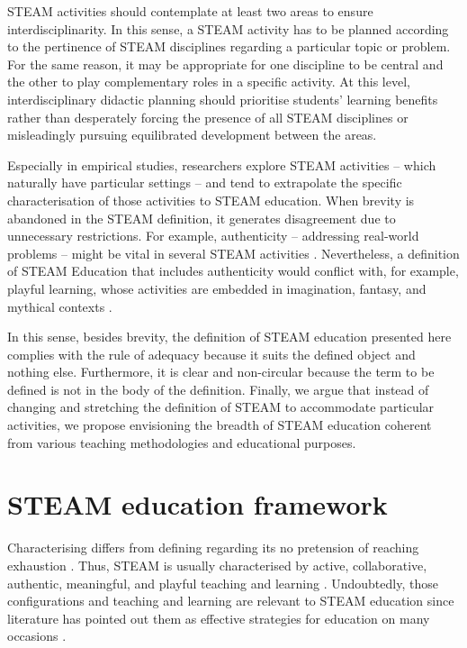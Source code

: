 \documentclass[english]{textolivre}
\begin{document}
STEAM activities should contemplate at least two areas to ensure interdisciplinarity. In this sense, a STEAM activity has to be planned according to the pertinence of STEAM disciplines regarding a particular topic or problem. For the same reason, it may be appropriate for one discipline to be central and the other to play complementary roles in a specific activity. At this level, interdisciplinary didactic planning should prioritise students’ learning benefits rather than desperately forcing the presence of all STEAM disciplines \cite{pearson_national_2017, thibaut_integrated_2018} or misleadingly pursuing equilibrated development between the areas.

Especially in empirical studies, researchers explore STEAM activities – which naturally have particular settings – and tend to extrapolate the specific characterisation of those activities to STEAM education. When brevity is abandoned in the STEAM definition, it generates disagreement due to unnecessary restrictions. For example, authenticity – addressing real-world problems – might be vital in several STEAM activities \cite{strobel_role_2013}. Nevertheless, a definition of STEAM Education that includes authenticity would conflict with, for example, playful learning, whose activities are embedded in imagination, fantasy, and mythical contexts \cite{rodrigues-silva_educacion_2023a}.

In this sense, besides brevity, the definition of STEAM education presented here complies with the rule of adequacy because it suits the defined object and nothing else. Furthermore, it is clear and non-circular because the term to be defined is not in the body of the definition. Finally, we argue that instead of changing and stretching the definition of STEAM to accommodate particular activities, we propose envisioning the breadth of STEAM education coherent from various teaching methodologies and educational purposes.

\section{STEAM education framework}

Characterising differs from defining regarding its no pretension of reaching exhaustion \cite{machlarz2011general}. Thus, STEAM is usually characterised by active, collaborative, authentic, meaningful, and playful teaching and learning \cite{lin_effect_2021, ortiz-revilla_mirada_2021, quigley_developing_2017}. Undoubtedly, those configurations and teaching and learning are relevant to STEAM education since literature has pointed out them as effective strategies for education on many occasions \cite{michael_wheres_2006}.
\end{document}
